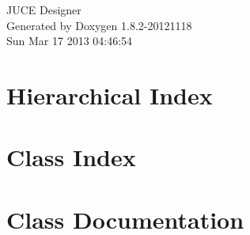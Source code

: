 \documentclass{book}
\begin{document}
\hypersetup{pageanchor=false,citecolor=blue}
\begin{titlepage}
\vspace*{7cm}
\begin{center}
{\Large J\-U\-C\-E Designer }\\
\vspace*{1cm}
{\large Generated by Doxygen 1.8.2-20121118}\\
\vspace*{0.5cm}
{\small Sun Mar 17 2013 04:46:54}\\
\end{center}
\end{titlepage}
\clearemptydoublepage
{}
\tableofcontents
\clearemptydoublepage
{}
\hypersetup{pageanchor=true,citecolor=blue}
\chapter{Hierarchical Index}

\chapter{Class Index}

\chapter{Class Documentation}




















\printindex
\end{document}
